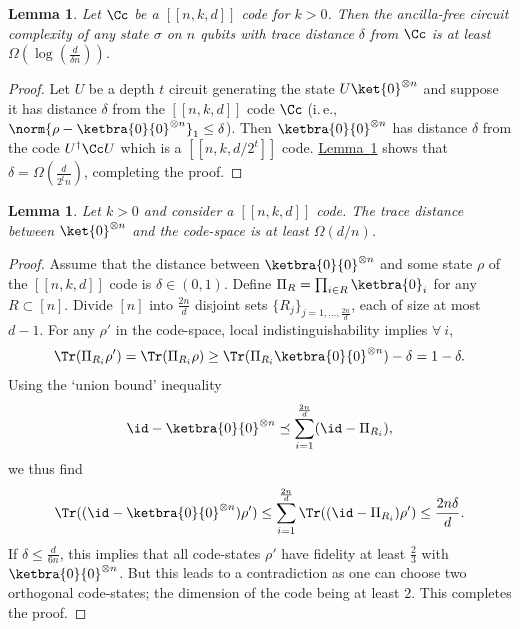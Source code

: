 \documentclass[11pt]{article}
\newcommand{\expref}[2]{\texorpdfstring{\hyperref[#2]{#1~\ref{#2}}}{#1~\ref{#2}}}
\newtheorem{lemma}[theorem]{Lemma}
\newcommand{\ie}{i.\,e.}
\begin{document}
\begin{lemma}
\label{lem:lineardist}
Let $\Cc$ be a $[[n,k,d]]$ code for $k > 0$. Then the ancilla-free circuit complexity of any state $\sigma$ on $n$ qubits with trace distance $\delta$ from $\Cc$ is at least $\Omega(\log (\frac{d}{\delta n}))$.
\end{lemma}

\begin{proof}
Let $U$ be a depth $t$ circuit generating the state $U\ket{0}^{\otimes n}$ and suppose it has distance $\delta$ from the $[[n,k,d]]$ code $\Cc$ (\ie, $\norm{\rho - \ketbra{0}{0}^{\otimes n}}_1 \leq \delta$). Then $\ketbra{0}{0}^{\otimes n}$ has distance $\delta$ from the code $U^\dagger\Cc U$ which is a $[[n,k,d/2^t]]$ code. \expref{Lemma}{lem:rotatedcodetrdist} shows that $\delta = \Omega \left(\frac{d}{2^t n} \right)$, completing the proof.
\end{proof}

\begin{lemma}
\label{lem:rotatedcodetrdist}
Let $k>0$ and consider a $[[n,k,d]]$ code. The trace distance between $\ket{0}^{\otimes n}$ and the code-space is at least $\Omega(d/n)$.
\end{lemma}


\begin{proof}
Assume that the distance between $\ketbra{0}{0}^{\otimes n}$ and some state $\rho$ of the $[[n,k,d]]$ code is $\delta \in (0,1)$. Define $\Pi_R =  \prod_{i \in R} \ketbra{0}_i$ for any $R\subset [n]$. Divide $[n]$ into $\frac{2n}{d}$ disjoint sets $\{R_j\}_{j=1, \ldots, \frac{2n}{d}}$, each of size at most $d - 1$. For any $\rho'$ in the code-space, local indistinguishability implies $\forall \ i$,
\begin{align}
\Tr(\Pi_{R_i}\rho')=\Tr(\Pi_{R_i}\rho) \geq \Tr(\Pi_{R_i}\ketbra{0}{0}^{\otimes n}) -\delta = 1-\delta.
\end{align}
Using the `union bound' inequality
\begin{align}\id-\ketbra{0}{0}^{\otimes n} \preceq \sum_{i=1}^{\frac{2n}{d}}(\id-\Pi_{R_i}),\end{align}
we thus find
\begin{align}\Tr((\id-\ketbra{0}{0}^{\otimes n})\rho')\leq \sum_{i=1}^{\frac{2n}{d}}\Tr((\id-\Pi_{R_i})\rho') \leq \frac{2n\delta}{d}.\end{align}
If $\delta \leq \frac{d}{6n}$, this implies that all code-states $\rho'$ have fidelity at least $\frac{2}{3}$ with $\ketbra{0}{0}^{\otimes n}$. But this leads to a contradiction as one can choose two orthogonal code-states; the dimension of the code being at least $2$. This completes the proof.
\end{proof}
\end{document}
